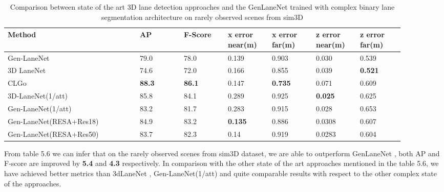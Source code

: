         \begin{table}[htbp]
    \centering
    \caption{Comparison between state of the art 3D lane detection approaches and the GenLaneNet \cite{Guo_2018_ECCV} trained with complex binary lane segmentation architecture on rarely observed scenes from sim3D \cite{}}
    \begin{tabular}{|p{0.3\linewidth}|p{0.1\linewidth}|p{0.1\linewidth}|p{0.1\linewidth}|p{0.1\linewidth}|p{0.1\linewidth}|p{0.1\linewidth}|}
    \hline
        \textbf{Method} & \textbf{AP} & \textbf{F-Score} & \textbf{x error near(m)} & \textbf{x error far(m)} & \textbf{z error near(m)} & \textbf{z error far(m)} \\ \hline
        Gen-LaneNet\cite{} & 79.0 & 78.0 & 0.139 & 0.903 & 0.030 & 0.539 \\ \hline
        3D LaneNet\cite{} & 74.6 & 72.0 & 0.166 & 0.855 & 0.039 &\textbf{ 0.521} \\ \hline
        CLGo\cite{} &\textbf{ 88.3} &\textbf{ 86.1} & 0.147 & \textbf{0.735} & 0.071 & 0.609 \\ \hline
        3D-LaneNet(1/att)\cite{} & 85.8 & 84.1 & 0.289 & 0.925 &\textbf{ 0.025} & 0.625 \\ \hline
        Gen-LaneNet(1/att)\cite{} & 83.2 & 81.7 & 0.283 & 0.915 & 0.028 & 0.653 \\ \hline
        Gen-LaneNet(RESA+Res18) &  84.9 & 83.2 &\textbf{ 0.135} & 0.886 & 0.0308 & 0.607 \\ \hline
        Gen-LaneNet(RESA+Res50) & 83.7 & 82.3 & 0.14 & 0.919 & 0.0283 & 0.604 \\ \hline
    \end{tabular}
\end{table}
    
    From table 5.6 we can infer that on the rarely observed scenes from sim3D dataset, we are able to outperform GenLaneNet \cite{guo2020gen}, both AP and F-score are improved by \textbf{5.4} and \textbf{4.3} respectively. In comparison with the other state of the art approaches mentioned in the table 5.6, we have achieved better metrics than 3dLaneNet \cite{}, Gen-LaneNet(1/att) \cite{} and quite comparable results with respect to the other complex state of the approaches. 
    
